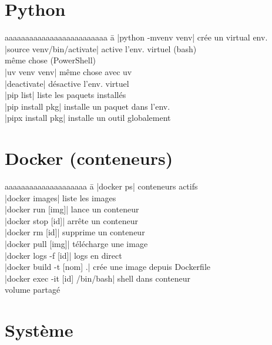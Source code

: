 \documentclass{article}
\begin{document}
\begin{multicols}{4}
    \section*{Python}
    \begin{tabbing}
        aaaaaaaaaaaaaaaaaaaaaaaaa \= a \kill
        \code|python -mvenv venv| \> crée un virtual env. \\
        \code|source venv/bin/activate| \> active l'env. virtuel (bash) \\
         \> même chose (PowerShell) \\
        \code|uv venv venv| \> même chose avec uv \\
        \code|deactivate| \> désactive l'env. virtuel \\
        \code|pip list| \> liste les paquets installés \\
        \code|pip install pkg| \> installe un paquet dans l'env. \\
        \code|pipx install pkg| \> installe un outil globalement
    \end{tabbing}

    \section*{Docker (conteneurs)}
    \begin{tabbing}
        aaaaaaaaaaaaaaaaaaaa \= a \kill
        \code|docker ps| \> conteneurs actifs \\
        \code|docker images| \> liste les images \\
        \code|docker run [img]| \> lance un conteneur \\
        \code|docker stop [id]| \> arrête un conteneur \\
        \code|docker rm [id]| \> supprime un conteneur \\
        \code|docker pull [img]| \> télécharge une image \\
        \code|docker logs -f [id]| \> logs en direct \\
        \code|docker build -t [nom] .| crée une image depuis Dockerfile \\
        \code|docker exec -it [id] /bin/bash| shell dans conteneur \\
         volume partagé \\
    \end{tabbing}

    \section*{Système}


\end{multicols}
\end{document}
